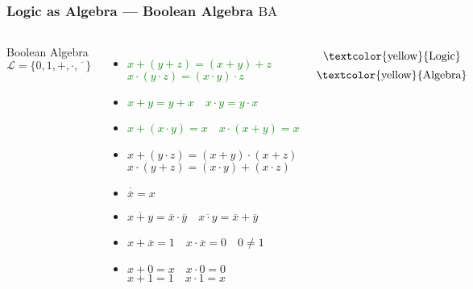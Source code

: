 \documentclass[UTF8,aspectratio=43,11pt,colorlinks,compress,openany]{beamer}%
\begin{document}
\begin{frame}\frametitle{Logic as Algebra --- Boolean Algebra $\mathrm{BA}$}
\begin{columns}[onlytextwidth]
Boolean Algebra $\mathscr{L}=\{0,1,+,\cdot,\overline{\phantom{x}}\}$
			\begin{itemize}
				\item \textcolor{green}{$x+(y+z)=(x+y)+z$}\\
				\textcolor{green}{$x\cdot(y\cdot z)=(x\cdot y)\cdot z$}
				\item \textcolor{green}{$x+y=y+x\quad x\cdot y=y\cdot x$}
				\item \textcolor{green}{$x+(x\cdot y)=x\quad x\cdot(x+y)=x$}
				\item $x+(y\cdot z)=(x+y)\cdot(x+z)$\\
				$x\cdot(y+z)=(x\cdot y)+(x\cdot z)$
				\item $\overline{\overline{x}}=x$
				\item $\overline{x+y}=\overline{x}\cdot\overline{y}\quad\overline{x\cdot y}=\overline{x}+\overline{y}$
				\item $x+\overline{x}=1\quad x\cdot\overline{x}=0\quad 0\neq 1$
				\item $x+0=x\quad x\cdot 0=0$
				$x+1=1\quad x\cdot 1=x$
			\end{itemize}
			\[\text{\textcolor{yellow}{Logic}}\]
			\vspace{-17pt}
			\vspace{-10pt}
			\[\text{\textcolor{yellow}{Algebra}}\]
	\end{columns}
\end{frame}
\end{document}
